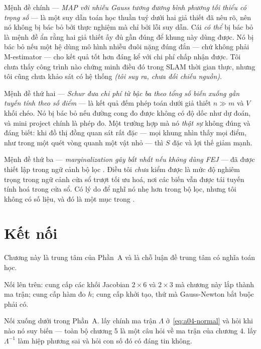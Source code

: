 \documentclass[../../vslam.tex]{subfiles}
\begin{document}
Mệnh đề chính --- \emph{MAP với nhiễu Gauss tương đương bình phương tối thiểu có trọng số} --- là một suy dẫn toán học thuần tuý dưới hai giả thiết đã nêu rõ, nên nó không bị bác bỏ bởi thực nghiệm mà chỉ bởi lỗi suy dẫn. Cái \emph{có thể} bị bác bỏ là mệnh đề ẩn rằng hai giả thiết ấy đủ gần đúng để khung này dùng được. Nó bị bác bỏ nếu một hệ dùng mô hình nhiễu đuôi nặng đúng đắn --- chứ không phải M-estimator --- cho kết quả tốt hơn đáng kể với chi phí chấp nhận được. Tôi chưa thấy công trình nào chứng minh điều đó trong SLAM thời gian thực, nhưng tôi cũng chưa khảo sát có hệ thống \emph{(tôi suy ra, chưa đối chiếu nguồn)}.

Mệnh đề thứ hai --- \emph{Schur đưa chi phí từ bậc ba theo tổng số biến xuống gần tuyến tính theo số điểm} --- là kết quả đếm phép toán dưới giả thiết \(n \gg m\) và \(V\) khối chéo. Nó bị bác bỏ nếu đường cong đo được không có độ dốc như dự đoán, và mini project chính là phép đo. Một trường hợp mà nó \emph{thật sự} không đúng và đáng biết: khi đồ thị đồng quan sát rất đặc --- mọi khung nhìn thấy mọi điểm, như trong một quét vòng quanh một vật nhỏ --- thì \(S\) đặc và lợi thế giảm mạnh.

Mệnh đề thứ ba --- \emph{marginalization gây bất nhất nếu không dùng FEJ} --- đã được thiết lập trong ngữ cảnh bộ lọc \cite{huang2008fej}. Điều tôi \emph{chưa} kiểm được là mức độ nghiêm trọng trong ngữ cảnh cửa sổ trượt tối ưu hoá, nơi các biến vẫn được tái tuyến tính hoá trong cửa sổ. Có lý do để nghĩ nó nhẹ hơn trong bộ lọc, nhưng tôi không có số liệu, và đó là một mục trong .

\section{Kết nối}

Chương này là trung tâm của Phần~A và là chỗ luận đề trung tâm có nghĩa toán học.

Nối lên trên:  cung cấp các khối Jacobian \(2\times6\) và \(2\times3\) mà chương này lắp thành ma trận;  cung cấp hàm đo \(h\);  cung cấp khởi tạo, thứ mà Gauss-Newton bắt buộc phải có.

Nối xuống dưới trong Phần~A.  lấy chính ma trận \(\Lambda\) ở~\eqref{eq:a04-normal} và hỏi khi nào nó suy biến --- toàn bộ chương 5 là một câu hỏi về ma trận của chương 4.  lấy \(\Lambda^{-1}\) làm hiệp phương sai và hỏi con số đó có đáng tin không.
\end{document}

